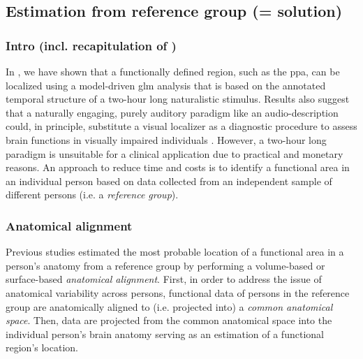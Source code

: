 \subsection{Estimation from reference group (= solution)}

\subsubsection{Intro (incl. recapitulation of \citet{haeusler2022processing})}

In \citet{haeusler2022processing}, we have shown that a functionally
defined region, such as the \ac{ppa}, can be localized using a model-driven
\ac{glm} analysis that is based on the annotated temporal structure of a
two-hour long naturalistic stimulus.
Results also suggest that a naturally engaging, purely auditory paradigm like an
audio-description could, in principle, substitute a visual localizer as a
diagnostic procedure to assess brain functions in visually impaired individuals
\citep{haeusler2022processing}.
However, a two-hour long paradigm is unsuitable for a clinical application due
to practical and monetary reasons.
An approach to reduce time and costs is to identify a functional area in an
individual person based on data collected from an independent sample of
different persons (i.e. a \textit{reference group}).


\subsubsection{Anatomical alignment}

Previous studies estimated the most probable location of a functional area in a
person's anatomy from a reference group by performing a volume-based
\citep[e.g.,][]{zhen2017quantifying, zhen2015quantifying} or surface-based
\citep[e.g.,][]{frost2012measuring, weiner2018defining,
rosenke2021probabilistic, wang2015probabilistic} \textit{anatomical alignment}.
%
First, in order to address the issue of anatomical variability across persons,
functional data of persons in the reference group are anatomically aligned to
(i.e.  projected into) a \textit{common anatomical space}.
Then, data are projected from the common anatomical space into the individual
person's brain anatomy serving as an estimation of a functional region's
location.

